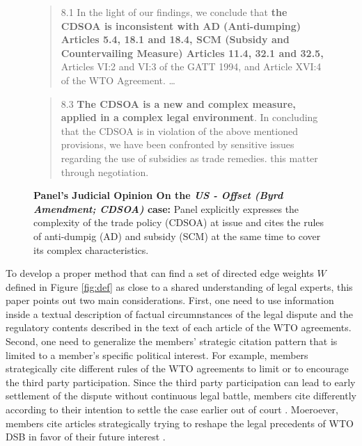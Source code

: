 \begin{figure}[h]
    \begin{quote}
        8.1 In the light of our findings, we conclude that \textbf{the CDSOA is inconsistent with AD (Anti-dumping)
        Articles 5.4, 18.1 and 18.4, SCM (Subsidy and Countervailing Measure) Articles 11.4, 32.1 and 32.5,} Articles VI:2 and VI:3 of the GATT
        1994, and Article XVI:4 of the WTO Agreement. \ldots
    \end{quote} 
    \begin{quote}
        8.3 \textbf{The CDSOA is a new and complex measure, applied in a complex legal environment}. In
        concluding that the CDSOA is in violation of the above mentioned provisions, we have been
        confronted by sensitive issues regarding the use of subsidies as trade remedies.
        this matter through negotiation.
    \end{quote} 
    \caption{\textbf{Panel's Judicial Opinion On the \textit{US - Offset (Byrd Amendment; CDSOA)} case:} Panel explicitly expresses the complexity of the trade policy (CDSOA) at issue and cites the rules of anti-dumpig (AD) and subsidy (SCM) at the same time to cover its complex characteristics.}
    \label{fig:complex-measure}
\end{figure}

To develop a proper method that can find a set of directed edge weights $W$ defined in Figure \ref{fig:def}
as close to a shared understanding of legal experts, this paper points out two main considerations. 
First, one need to use information inside a textual description of factual circumnstances of the legal dispute and the regulatory contents described in the text of each article of the WTO agreements.
Second, one need to generalize the members' strategic citation pattern that is limited to a member's specific political interest.
For example, members strategically cite different rules of the WTO agreements to limit or to encourage
the third party participation. Since the third party participation
can lead to early settlement of the dispute without continuous
legal battle, members cite differently according to their intention to
settle the case earlier out of court \citep{who_gets}. Moeroever, members cite articles strategically trying to reshape the legal precedents of WTO DSB
in favor of their future interest \citep{pelc, latent}. 

